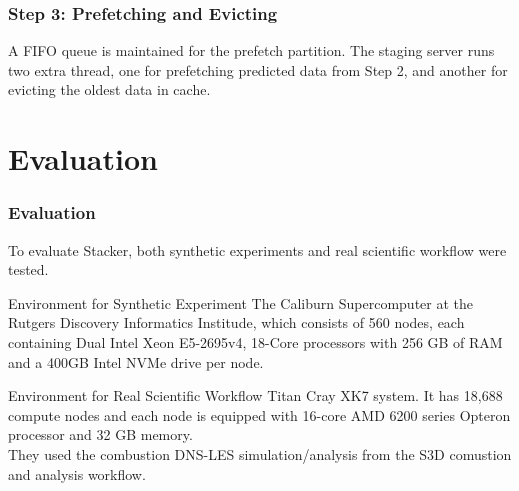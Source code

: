 \documentclass{beamer}
\begin{document}
\begin{frame}
\frametitle{Step 3: Prefetching and Evicting}
            A FIFO queue is maintained for the prefetch partition. The staging server runs two extra thread, one for prefetching predicted data from Step 2, and another for evicting the oldest data in cache.
\end{frame}

\section{Evaluation}
\begin{frame}
\frametitle{Evaluation}
To evaluate Stacker, both synthetic experiments and real scientific workflow were tested.
\begin{block}{Environment for Synthetic Experiment}
        The Caliburn Supercomputer at the Rutgers Discovery Informatics Institude, which consists of 560 nodes, each containing Dual Intel Xeon E5-2695v4, 18-Core processors with 256 GB of RAM and a 400GB Intel NVMe drive per node.
\end{block}
\begin{block}{Environment for Real Scientific Workflow}
Titan Cray XK7 system. It has 18,688 compute nodes and each node is equipped with 16-core AMD 6200 series Opteron processor and 32 GB memory. \\

They used the combustion DNS-LES simulation/analysis from the S3D comustion and analysis workflow.
\end{block}
\end{frame}
\end{document}
